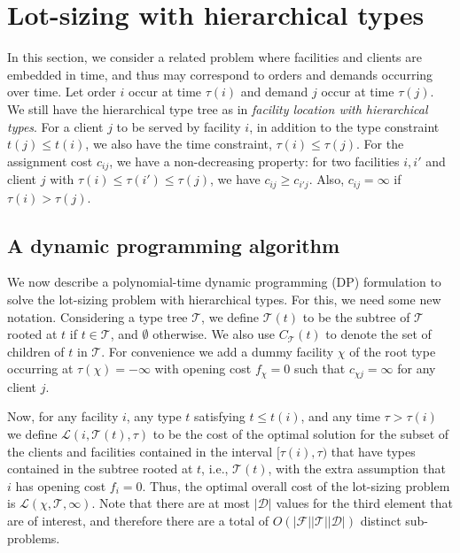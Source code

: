 
\section{Lot-sizing with hierarchical types}

In this section, we consider a related problem where facilities and clients are embedded in time, and thus may correspond to orders and demands occurring over time. Let order $i$ occur at time $\tau(i)$ and demand $j$ occur at time $\tau(j)$. We still have the hierarchical type tree as in \textit{facility location with hierarchical types}. For a client $j$ to be served by facility $i$, in addition to the type constraint $t(j) \le t(i)$, we also have the time constraint, $\tau(i) \le \tau(j)$. For the assignment cost $c_{ij}$, we have a non-decreasing property: for two facilities $i,i'$ and client $j$ with $\tau(i) \le \tau(i') \le \tau(j)$, we have $c_{ij} \ge c_{i'j}$. Also, $c_{ij} = \infty$ if $\tau(i) > \tau(j)$.

\subsection{A dynamic programming algorithm}

We now describe a polynomial-time dynamic programming (DP) formulation to solve
the lot-sizing problem with hierarchical types. For this, we need some new notation. Considering a type tree $\mathcal{T}$, we define $\mathcal{T}(t)$ to be the subtree of $\mathcal{T}$ rooted at $t$ if $t \in \mathcal{T}$, and $\emptyset$ otherwise. We also use $C_\mathcal{T}(t)$ to denote the set of children of $t$ in $\mathcal{T}$. %
%
For convenience we add a dummy facility $\chi$ of the root type occurring at $\tau(\chi) = -\infty$ with opening cost $f_\chi = 0$ such that $c_{\chi j} = \infty$ for any client $j$.

Now, for any facility $i$, any type $t$ satisfying $t \le t(i)$, and any time $\tau > \tau(i)$ we define $\mathcal{L}(i,\mathcal{T}(t), \tau)$ to be the cost of the optimal solution for the subset of the clients and facilities contained in the interval $[\tau(i),\tau)$ that have types contained in the subtree rooted at $t$, i.e., $\mathcal{T}(t)$, with the extra assumption that $i$ has opening cost $f_i = 0$. Thus, the optimal overall cost of the lot-sizing problem is $\mathcal{L}(\chi, \mathcal{T}, \infty)$. Note that there are at most $|\mathcal{D}|$ values for the third element that are of interest, and therefore there are a total of $O(|\mathcal{F}||\mathcal{T}||\mathcal{D}|)$ distinct sub-problems.

